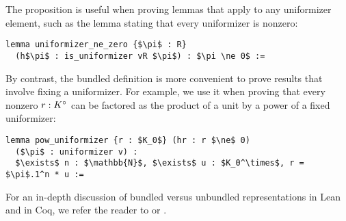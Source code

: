 \documentclass[sigplan,screen]{acmart}
\begin{document}
The proposition  is useful when proving lemmas that apply to any uniformizer element, such as the lemma stating that every uniformizer is nonzero\href{https://github.com/mariainesdff/local_fields_journal/blob/0b408ff3af36e18f991f9d4cb87be3603cfc3fc3/src/discrete_valuation_ring/basic.lean#L178}{\extlink}:
\begin{lstlisting}
lemma uniformizer_ne_zero {$\pi$ : R}
  (h$\pi$ : is_uniformizer vR $\pi$) : $\pi \ne 0$ := 
\end{lstlisting}
By contrast, the bundled definition is more convenient to prove results that involve fixing a uniformizer. For example, we use it when proving that every nonzero $r : {K}^\circ$ can be factored as the product of a unit by a power of a fixed uniformizer\href{https://github.com/mariainesdff/local_fields_journal/blob/0b408ff3af36e18f991f9d4cb87be3603cfc3fc3/src/discrete_valuation_ring/basic.lean#L259}{\extlink}:
\begin{lstlisting}
lemma pow_uniformizer {r : $K_0$} (hr : r $\ne$ 0)
  ($\pi$ : uniformizer v) :
  $\exists$ n : $\mathbb{N}$, $\exists$ u : $K_0^\times$, r = $\pi$.1^n * u :=
\end{lstlisting}

For an in-depth discussion of bundled versus unbundled representations in Lean and in Coq, we refer the reader to \cite{Baa22} or \cite{typeclassesCoq}.
\end{document}
